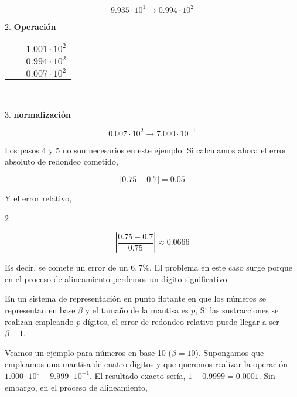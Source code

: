 \begin{equation*}
9.935\cdot 10^1\rightarrow 0.994 \cdot 10^2
\end{equation*}

\begin{paracol}{2}
2. \textbf{Operación}
\end{paracol}
\begin{tabular}{c r}
&$1.001\cdot10^2$\\
$-$&$0.994\cdot10^2$\\
\hline
&$0.007\cdot10^2$
\end{tabular}\\

\begin{paracol}{2}
3. \textbf{normalización}
\end{paracol}
\begin{equation*}
0.007\cdot10^2\rightarrow 7.000\cdot10^{-1}
\end{equation*}

\begin{paracol}{2}
Los pasos $4$ y $5$ no son necesarios en este ejemplo. Si calculamos ahora el error absoluto de redondeo cometido,
\end{paracol}
\begin{equation*}
\vert 0.75-0.7 \vert =0.05
\end{equation*} 
\begin{paracol}{2}
Y el error relativo,
\end{paracol}{2}

\begin{equation*}
\left\vert\frac{0.75-0.7}{0.75}\right\vert\approx 0.0666
\end{equation*}
\begin{paracol}{2}
Es decir, se comete un error de un $6,7\%$. El problema en este caso surge porque en el proceso de alineamiento perdemos un dígito significativo.

 En un sistema de representación en punto flotante en que los números se representan en base $\beta$ y el tamaño de la mantisa es $p$, Si las sustracciones se realizan empleando $p$ dígitos, el error de redondeo relativo puede llegar a ser $\beta-1$.
 
Veamos un ejemplo para números en base 10 ($\beta=10$). Supongamos que empleamos una mantisa de cuatro dígitos y que queremos realizar la operación $1.000\cdot10^0-9.999\cdot10^{-1}$. El resultado exacto sería, $1-0.9999=0.0001$. Sin embargo, en el proceso de alineamiento,
\end{paracol}

